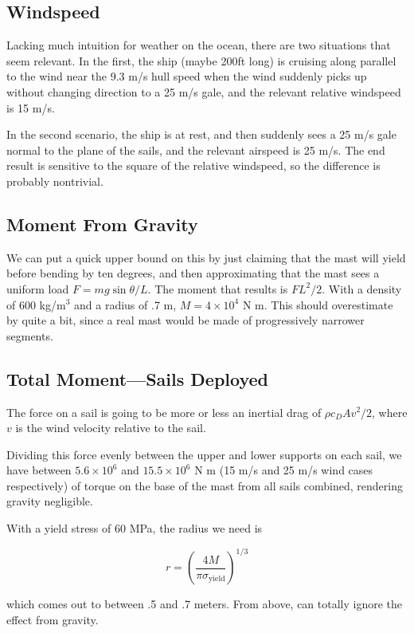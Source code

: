 \documentclass[12pt]{article}
\begin{document}
\subsection{Windspeed}

Lacking much intuition for weather on the ocean, there are two situations that seem relevant. In the first, the ship (maybe 200ft long) is cruising along parallel to the wind near the 9.3 m/s hull speed when the wind suddenly picks up without changing direction to a 25 m/s gale, and the relevant relative windspeed is 15 m/s.

In the second scenario, the ship is at rest, and then suddenly sees a 25 m/s gale normal to the plane of the sails, and the relevant airspeed is 25 m/s. The end result is sensitive to the square of the relative windspeed, so the difference is probably nontrivial.

\subsection{Moment From Gravity}

We can put a quick upper bound on this by just claiming that the mast will yield before bending by ten degrees, and then approximating that the mast sees a uniform load \(F=mg\sin\theta/L\). The moment that results is \(FL^2/2\). With a density of 600 kg/m\(^3\) and a radius of .7 m, \(M = 4 \times 10^4\) N m. This should overestimate by quite a bit, since a real mast would be made of progressively narrower segments.

\subsection{Total Moment---Sails Deployed}

The force on a sail is going to be more or less an inertial drag of \(\rho c_D A v^2/2\), where \(v\) is the wind velocity relative to the sail.

Dividing this force evenly between the upper and lower supports on each sail, we have between \(5.6 \times 10^6\) and \(15.5 \times 10^6\) N m (15 m/s and 25 m/s wind cases respectively) of torque on the base of the mast from all sails combined, rendering gravity negligible.

With a yield stress of 60 MPa, the radius we need is

\[r = \left( \frac{4M}{\pi \sigma_{\mathrm{yield}}}   \right)^{1/3}
\]

which comes out to between .5 and .7 meters. From above, can totally ignore the effect from gravity.
\end{document}
